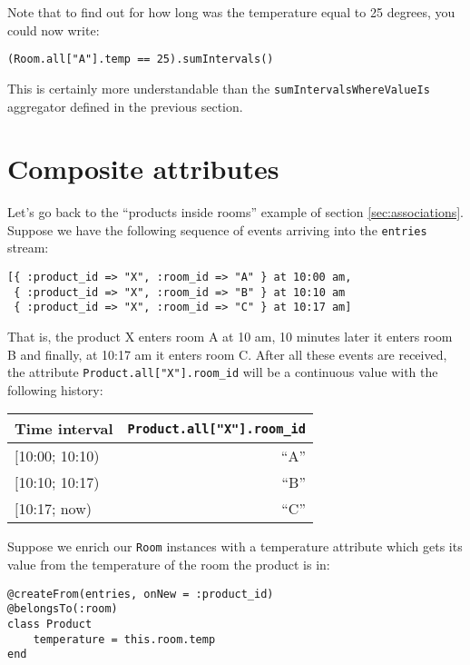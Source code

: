 \documentclass{report}
\begin{document}
Note that to find out for how long was the temperature equal to 25
degrees, you could now write:

\begin{verbatim}
(Room.all["A"].temp == 25).sumIntervals()
\end{verbatim}


This is certainly more understandable than the
\verb=sumIntervalsWhereValueIs= aggregator defined in the previous
section.

\section{Composite attributes}

Let's go back to the ``products inside rooms'' example of section
\ref{sec:associations}. Suppose we have the following sequence of
events arriving into the \verb=entries= stream:

\begin{verbatim}
[{ :product_id => "X", :room_id => "A" } at 10:00 am,
 { :product_id => "X", :room_id => "B" } at 10:10 am
 { :product_id => "X", :room_id => "C" } at 10:17 am]
\end{verbatim}

That is, the product X enters room A at 10 am, 10 minutes later it
enters room B and finally, at 10:17 am it enters room C. After all
these events are received, the attribute
\verb=Product.all["X"].room_id= will be a continuous value with the
following history:

\begin{tabular}{ |l|r| }
  \hline
  Time interval & \verb=Product.all["X"].room_id= \\
  \hline
  $[$10:00; 10:10) & ``A'' \\
  $[$10:10; 10:17) & ``B'' \\
  $[$10:17;   now) & ``C'' \\
  \hline
\end{tabular}

Suppose we enrich our \verb=Room= instances with a temperature
attribute which gets its value from the temperature of the room the
product is in:

\begin{verbatim}
@createFrom(entries, onNew = :product_id)
@belongsTo(:room)
class Product
    temperature = this.room.temp
end
\end{verbatim}
\end{document}
